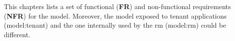 This chapters lists a set of functional (\textbf{FR}) and non-functional requirements (\textbf{NFR}) for the \gls{model}.
Moreover, the model exposed to tenant applications (\gls{model:tenant}) and the one internally used by the \gls{rm} (\gls{model:rm}) could be different.